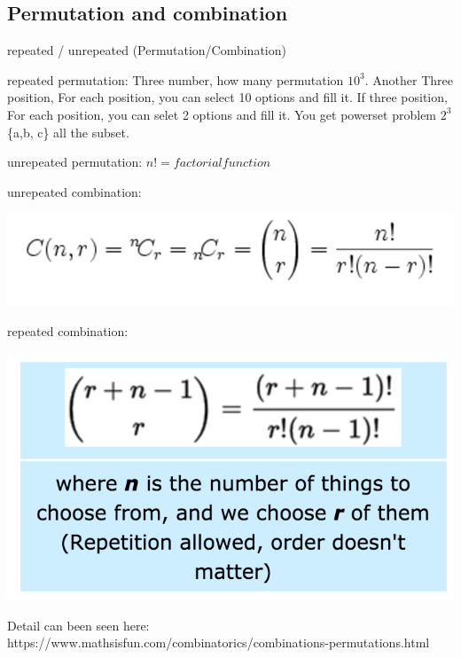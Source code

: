 \documentclass[a4paper,11pt,twoside]{book}
\begin{document}
\subsection{Permutation and combination}

	\par repeated / unrepeated (Permutation/Combination)

	\par repeated permutation: Three number, how many permutation $10^3$. Another Three position, For each position, you can select 10 options and fill it.  If three position, For each position, you can selet 2 options and fill it. You get powerset problem $2^3$ \{a,b, c\} all the subset. 

	\par unrepeated permutation: $n! = factorial function$

	\par unrepeated combination:  
\begin{center}
	\includegraphics[scale=0.4]{pics/UC.png}
\end{center}	
 
	\par repeated combination: 
\begin{center}
	\includegraphics[scale=0.38]{pics/RC.png} 
\end{center}

	\par Detail can been seen here: https://www.mathsisfun.com/combinatorics/combinations-permutations.html
\end{document}
